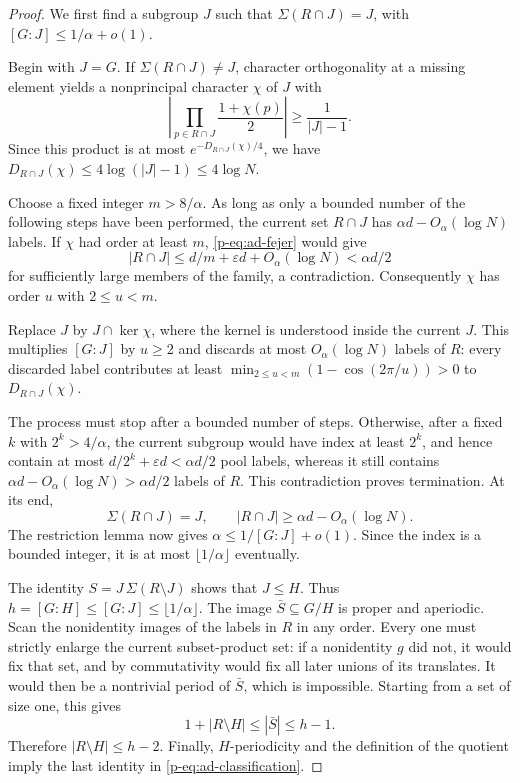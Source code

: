 \documentclass[11pt,a4paper]{article}
\theoremstyle{definition}
\theoremstyle{remark}
\begin{document}
\begin{proof}
We first find a subgroup $J$ such that $\Sigma(R\cap J)=J$, with
$[G:J]\leq1/\alpha+o(1)$.

Begin with $J=G$. If $\Sigma(R\cap J)\ne J$, character orthogonality
at a missing element yields a nonprincipal character $\chi$ of $J$
with
\[
 \left|\prod_{p\in R\cap J}\frac{1+\chi(p)}2\right|
 \geq\frac1{|J|-1}.
\]
Since this product is at most $e^{-D_{R\cap J}(\chi)/4}$, we have
$D_{R\cap J}(\chi)\leq4\log(|J|-1)\leq4\log N$.

Choose a fixed integer $m>8/\alpha$. As long as only a bounded number
of the following steps have been performed, the current set $R\cap J$
has $\alpha d-O_\alpha(\log N)$ labels. If $\chi$ had order at least
$m$, \eqref{p-eq:ad-fejer} would give
\[
 |R\cap J|\leq d/m+\varepsilon d+O_\alpha(\log N)
 <\alpha d/2
\]
for sufficiently large members of the family, a contradiction.
Consequently $\chi$ has order $u$ with $2\leq u<m$.

Replace $J$ by $J\cap\ker\chi$, where the kernel is understood inside
the current $J$. This multiplies $[G:J]$ by $u\geq2$ and discards at
most $O_\alpha(\log N)$ labels of $R$: every discarded label contributes
at least
$\min_{2\leq u<m}(1-\cos(2\pi/u))>0$ to $D_{R\cap J}(\chi)$.

The process must stop after a bounded number of steps. Otherwise, after
a fixed $k$ with $2^k>4/\alpha$, the current subgroup would have
index at least $2^k$, and hence contain at most
$d/2^k+\varepsilon d<\alpha d/2$ pool labels, whereas it still contains
$\alpha d-O_\alpha(\log N)>\alpha d/2$ labels of $R$.
This contradiction proves termination. At its end,
\[
 \Sigma(R\cap J)=J,
 \qquad |R\cap J|\geq\alpha d-O_\alpha(\log N).
\]
The restriction lemma now gives
$\alpha\leq1/[G:J]+o(1)$. Since the index is a bounded integer, it is
at most $\lfloor1/\alpha\rfloor$ eventually.

The identity
$S=J\,\Sigma(R\setminus J)$ shows that $J\leq H$.
Thus $h=[G:H]\leq[G:J]\leq\lfloor1/\alpha\rfloor$.
The image $\bar S\subseteq G/H$ is proper and aperiodic. Scan the
nonidentity images of the labels in $R$ in any order. Every one must
strictly enlarge the current subset-product set: if a nonidentity
$g$ did not, it would fix that set, and by commutativity would fix all
later unions of its translates. It would then be a nontrivial period
of $\bar S$, which is impossible. Starting from a set of size one, this
gives
\[
 1+|R\setminus H|\leq|\bar S|\leq h-1.
\]
Therefore $|R\setminus H|\leq h-2$. Finally, $H$-periodicity and the
definition of the quotient imply the last identity in
\eqref{p-eq:ad-classification}.
\end{proof}
\end{document}
